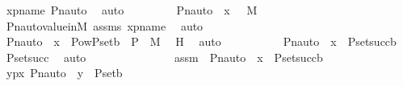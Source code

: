 \begin{isabellebody}
\ xpname\ Pn{\isacharunderscore}{\kern0pt}auto\ \isamarkupfalse%
\ auto\ \isanewline
\ \ \ \ \ \ \isamarkupfalse%
\ {\isachardoublequoteopen}Pn{\isacharunderscore}{\kern0pt}auto{\isacharparenleft}{\kern0pt}{\isasympi}{\isacharparenright}{\kern0pt}\ {\isacharbackquote}{\kern0pt}\ x\ \ {\isasymin}\ M{\isachardoublequoteclose}\ \isamarkupfalse%
\ Pn{\isacharunderscore}{\kern0pt}auto{\isacharunderscore}{\kern0pt}value{\isacharunderscore}{\kern0pt}in{\isacharunderscore}{\kern0pt}M\ assms\ xpname\ \isamarkupfalse%
\ auto\ \isanewline
\ \ \ \ \ \ \isamarkupfalse%
\ \isamarkupfalse%
\ {\isachardoublequoteopen}Pn{\isacharunderscore}{\kern0pt}auto{\isacharparenleft}{\kern0pt}{\isasympi}{\isacharparenright}{\kern0pt}\ {\isacharbackquote}{\kern0pt}\ x\ {\isasymin}\ Pow{\isacharparenleft}{\kern0pt}P{\isacharunderscore}{\kern0pt}set{\isacharparenleft}{\kern0pt}b{\isacharparenright}{\kern0pt}\ {\isasymtimes}\ P{\isacharparenright}{\kern0pt}\ {\isasyminter}\ M{\isachardoublequoteclose}\ \isamarkupfalse%
\ H\ \isamarkupfalse%
\ auto\ \isanewline
\ \ \ \ \ \ \isamarkupfalse%
\ \isamarkupfalse%
\ {\isachardoublequoteopen}Pn{\isacharunderscore}{\kern0pt}auto{\isacharparenleft}{\kern0pt}{\isasympi}{\isacharparenright}{\kern0pt}\ {\isacharbackquote}{\kern0pt}\ x\ {\isasymin}\ P{\isacharunderscore}{\kern0pt}set{\isacharparenleft}{\kern0pt}succ{\isacharparenleft}{\kern0pt}b{\isacharparenright}{\kern0pt}{\isacharparenright}{\kern0pt}{\isachardoublequoteclose}\ \isamarkupfalse%
\ P{\isacharunderscore}{\kern0pt}set{\isacharunderscore}{\kern0pt}succ\ \isamarkupfalse%
\ auto\ \isanewline
\ \ \ \ \isamarkupfalse%
\ \isanewline
\ \ \ \ \ \ \isamarkupfalse%
\ assm\ {\isacharcolon}{\kern0pt}\ {\isachardoublequoteopen}Pn{\isacharunderscore}{\kern0pt}auto{\isacharparenleft}{\kern0pt}{\isasympi}{\isacharparenright}{\kern0pt}\ {\isacharbackquote}{\kern0pt}\ x\ {\isasymin}\ P{\isacharunderscore}{\kern0pt}set{\isacharparenleft}{\kern0pt}succ{\isacharparenleft}{\kern0pt}b{\isacharparenright}{\kern0pt}{\isacharparenright}{\kern0pt}{\isachardoublequoteclose}\ \isanewline
\ \ \ \ \ \ \isamarkupfalse%
\ {\isachardoublequoteopen}{\isasymforall}{\isasymlangle}y{\isacharcomma}{\kern0pt}p{\isasymrangle}{\isasymin}x{\isachardot}{\kern0pt}\ Pn{\isacharunderscore}{\kern0pt}auto{\isacharparenleft}{\kern0pt}{\isasympi}{\isacharparenright}{\kern0pt}\ {\isacharbackquote}{\kern0pt}\ y\ {\isasymin}\ P{\isacharunderscore}{\kern0pt}set{\isacharparenleft}{\kern0pt}b{\isacharparenright}{\kern0pt}{\isachardoublequoteclose}\ \isanewline

\end{isabellebody}
